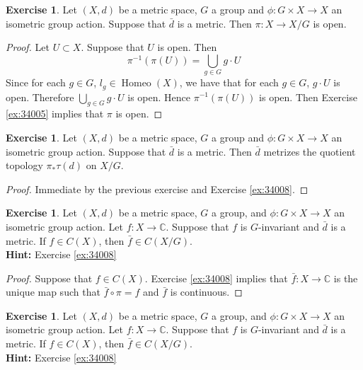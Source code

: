\documentclass[12pt]{amsart}
\theoremstyle{definition}
\newtheorem{ex}[definition]{Exercise}
\newcommand{\C}{\mathbb{C}}
\newcommand{\tbf}[1]{\textbf{#1}}
\DeclareMathOperator{\Homeo}{Homeo}
\DeclareMathOperator*{\0}{\mbf{0}}
\DeclareMathOperator*{\1}{\mbf{1}}
\newcommand{\rex}[1]{Exercise \ref{ex:#1}}
\begin{document}
	\begin{ex}
	Let $(X,d)$ be a metric space, $G$ a group and $\phi: G \times X \rightarrow X$ an isometric group action. Suppose that $\bar{d}$ is a metric. Then $\pi:X \rightarrow X/G$ is open.
	\end{ex}
	
	\begin{proof}
	Let $U \subset X$. Suppose that $U$ is open. Then 
	\begin{equation*}
	\pi^{-1}(\pi(U)) = \bigcup_{g \in G} g \cdot U
	\end{equation*}		
	Since for each $g \in G$, $l_g \in \Homeo(X)$, we have that for each $g \in G$, $g \cdot U$ is open. Therefore $\bigcup\limits_{g \in G} g \cdot U$ is open. Hence $\pi^{-1}(\pi(U))$ is open. Then \rex{34005} implies that $\pi$ is open.
	\end{proof}
	
	\begin{ex}
	Let $(X,d)$ be a metric space, $G$ a group and $\phi: G \times X \rightarrow X$ an isometric group action. Suppose that $\bar{d}$ is a metric. Then $\bar{d}$ metrizes the quotient topology $\pi_*\tau(d)$ on $X/G$.
	\end{ex}
	
	\begin{proof}
	Immediate by the previous exercise and \rex{34008}.
	\end{proof}
	
	\begin{ex}
	Let $(X, d)$ be a metric space, $G$ a group, and $\phi: G \times X \rightarrow X$ an isometric group action. Let $f: X \rightarrow \C$. Suppose that $f$ is $G$-invariant and $\bar{d}$ is a metric. If $f \in C(X)$, then $\bar{f} \in C(X/G)$.  \\
	\tbf{Hint:} \rex{34008}
	\end{ex}
	
	\begin{proof}
	Suppose that $f \in C(X)$. \rex{34008} implies that $\bar{f}: X \rightarrow \C$ is the unique map such that $\bar{f} \circ \pi = f$ and $\bar{f}$ is continuous. 
	\end{proof}
	
	\begin{ex}
	Let $(X, d)$ be a metric space, $G$ a group, and $\phi: G \times X \rightarrow X$ an isometric group action. Let $f: X \rightarrow \C$. Suppose that $f$ is $G$-invariant and $\bar{d}$ is a metric. If $f \in C(X)$, then $\bar{f} \in C(X/G)$.  \\
	\tbf{Hint:} \rex{34008}
	\end{ex}
	
\end{document}
